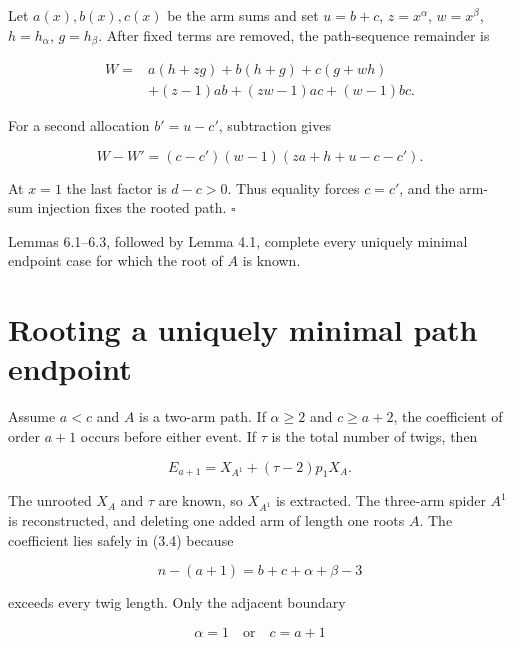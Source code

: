 \documentclass[11pt]{article}
\begin{document}
Let $a(x),b(x),c(x)$ be the arm sums and set $u=b+c$, $z=x^\alpha$, $w=x^\beta$,
$h=h_\alpha$, $g=h_\beta$. After fixed terms are removed, the path-sequence remainder is

\begin{equation*}
\begin{aligned}
W={}&a(h+zg)+b(h+g)+c(g+wh)\\
&+(z-1)ab+(zw-1)ac+(w-1)bc.
\end{aligned}
\tag{6.10}
\end{equation*}


For a second allocation $b'=u-c'$, subtraction gives

\begin{equation*}
W-W'=(c-c')(w-1)(za+h+u-c-c').
\tag{6.11}
\end{equation*}


At $x=1$ the last factor is $d-c>0$. Thus equality forces $c=c'$, and the arm-sum injection fixes
the rooted path. $\square$

Lemmas 6.1--6.3, followed by Lemma 4.1, complete every uniquely minimal endpoint case for which the
root of $A$ is known.

\section{Rooting a uniquely minimal path endpoint}


Assume $a<c$ and $A$ is a two-arm path. If $\alpha\geq2$ and $c\geq a+2$, the coefficient of
order $a+1$ occurs before either event. If $\tau$ is the total number of twigs, then

\begin{equation*}
E_{a+1}=X_{A^1}+(\tau-2)p_1X_A.
\tag{7.1}
\end{equation*}


The unrooted $X_A$ and $\tau$ are known, so $X_{A^1}$ is extracted. The three-arm spider $A^1$ is
reconstructed, and deleting one added arm of length one roots $A$. The coefficient lies safely in
(3.4) because

\begin{equation*}
n-(a+1)=b+c+\alpha+\beta-3
\end{equation*}


exceeds every twig length. Only the adjacent boundary

\begin{equation*}
\alpha=1\quad\text{or}\quad c=a+1
\tag{7.2}
\end{equation*}
\end{document}

